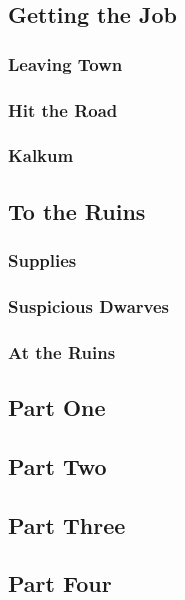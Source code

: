 

\subsection{Getting the Job}


\subsubsection{Leaving Town}


\subsubsection{Hit the Road}


\subsubsection{Kalkum}


\subsection{To the Ruins}


\subsubsection{Supplies}


\subsubsection{Suspicious Dwarves}


\subsubsection{At the Ruins}


\subsection{Part One}


\subsection{Part Two}


\subsection{Part Three}


\subsection{Part Four}

